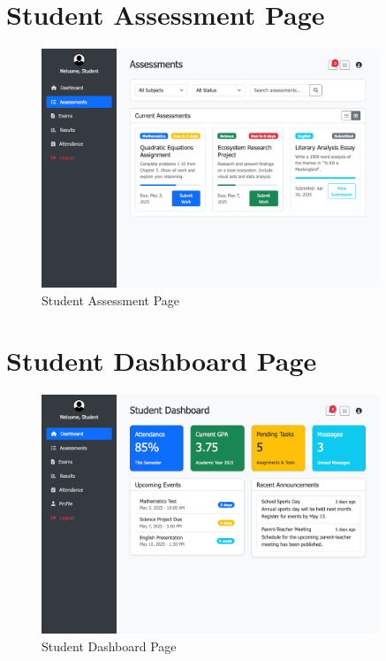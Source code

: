 \documentclass[12pt,a4paper]{report}
\begin{document}
\section{Student Assessment Page}
\begin{figure}[htbp]
    \centering
    \includegraphics[width=0.9\textwidth]{student-assessment-page.png}
    \caption{Student Assessment Page}
    \label{fig:student-assessment-page}
\end{figure}

\section{Student Dashboard Page}
\begin{figure}[htbp]
    \centering
    \includegraphics[width=0.9\textwidth]{student-dashboard-page.png}
    \caption{Student Dashboard Page}
    \label{fig:student-dashboard-page}
\end{figure}
\end{document}

